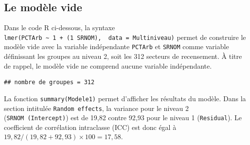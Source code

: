 \documentclass[
  11pt,
  french,
]{book}
\makeatletter
\newenvironment{Shaded}{\begin{snugshade}}{\end{snugshade}}
\newcommand{\CommentTok}[1]{\textcolor[rgb]{0.56,0.35,0.01}{\textit{#1}}}
\newcommand{\DataTypeTok}[1]{\textcolor[rgb]{0.13,0.29,0.53}{#1}}
\newcommand{\DecValTok}[1]{\textcolor[rgb]{0.00,0.00,0.81}{#1}}
\newcommand{\KeywordTok}[1]{\textcolor[rgb]{0.13,0.29,0.53}{\textbf{#1}}}
\newcommand{\NormalTok}[1]{#1}
\newcommand{\OperatorTok}[1]{\textcolor[rgb]{0.81,0.36,0.00}{\textbf{#1}}}
\newcommand{\StringTok}[1]{\textcolor[rgb]{0.31,0.60,0.02}{#1}}
\newenvironment{kframe}{%
\medskip{}
\setlength{\fboxsep}{.8em}
 \def\at@end@of@kframe{}%
 \ifinner\ifhmode%
  \def\at@end@of@kframe{\end{minipage}}%
  \begin{minipage}{\columnwidth}%
 \fi\fi%
 \def\FrameCommand##1{\hskip\@totalleftmargin \hskip-\fboxsep
 \colorbox{shadecolor}{##1}\hskip-\fboxsep
     \hskip-\linewidth \hskip-\@totalleftmargin \hskip\columnwidth}%
 \MakeFramed {\advance\hsize-\width
   \@totalleftmargin\z@ \linewidth\hsize
   \@setminipage}}%
 {\par\unskip\endMakeFramed%
 \at@end@of@kframe}
\renewenvironment{Shaded}{\begin{kframe}}{\end{kframe}}
\makeatother
\begin{document}
\hypertarget{sect0841}{%
\subsection{Le modèle vide}\label{sect0841}}

Dans le code R ci-dessous, la syntaxe \texttt{lmer(PCTArb\ \textasciitilde{}\ 1\ +\ (1\textbar{}\ SRNOM),\ \ data\ =\ Multiniveau)} permet de construire le modèle vide avec la variable indépendante \texttt{PCTArb} et \texttt{SRNOM} comme variable définissant les groupes au niveau 2, soit les 312 secteurs de recensement. À titre de rappel, le modèle vide ne comprend aucune variable indépendante.

\begin{Shaded}
\end{Shaded}

\begin{verbatim}
## nombre de groupes = 312
\end{verbatim}

La fonction \texttt{summary(Modele1)} permet d'afficher les résultats du modèle. Dans la section intitulée \texttt{Random\ effects}, la variance pour le niveau 2 (\texttt{SRNOM\ (Intercept)}) est de 19,82 contre 92,93 pour le niveau 1 (\texttt{Residual}). Le coefficient de corrélation intraclasse (ICC) est donc égal à \(19,82 / (19,82+92,93) \times 100 = 17,58%
\).
\end{document}
